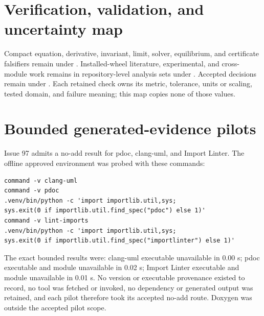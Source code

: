 \documentclass{article}
\begin{document}
\section{Verification, validation, and uncertainty map}

Compact equation, derivative, invariant, limit, solver, equilibrium, and
certificate falsifiers remain under . Installed-wheel literature,
experimental, and cross-module work remains in repository-level analysis sets
under . Accepted decisions remain under
. Each retained check owns
its metric, tolerance, units or scaling, tested domain, and failure meaning;
this map copies none of those values.

\section{Bounded generated-evidence pilots}

Issue 97 admits a no-add result for pdoc, clang-uml, and Import Linter. The
offline approved environment was probed with these commands:

\begin{verbatim}
command -v clang-uml
command -v pdoc
.venv/bin/python -c 'import importlib.util,sys;
sys.exit(0 if importlib.util.find_spec("pdoc") else 1)'
command -v lint-imports
.venv/bin/python -c 'import importlib.util,sys;
sys.exit(0 if importlib.util.find_spec("importlinter") else 1)'
\end{verbatim}

The exact bounded results were: clang-uml executable unavailable in 0.00 s;
pdoc executable and module unavailable in 0.02 s; Import Linter executable and
module unavailable in 0.01 s. No version or executable provenance existed to
record, no tool was fetched or invoked, no dependency or generated output was
retained, and each pilot therefore took its accepted no-add route. Doxygen was
outside the accepted pilot scope.
\end{document}
